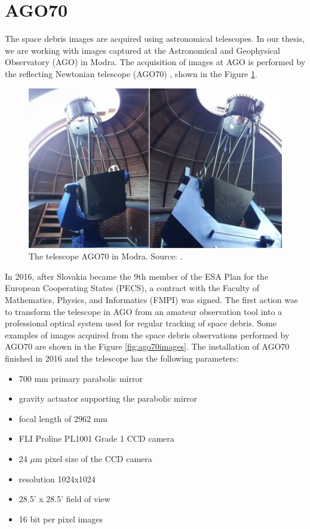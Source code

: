 \section{AGO70}
The space debris images are acquired using astronomical telescopes. 
In our thesis, we are working with images captured at the Astronomical and Geophysical Observatory (AGO) in Modra. The acquisition of images at AGO is performed by the reflecting Newtonian telescope (AGO70) \cite{ago702018}, shown in the Figure \ref{img:ago70}. 

\begin{figure}[h]
    \centering
    \includegraphics[width=.5\textwidth]{images/ago70.png}
    \caption{The telescope AGO70 in Modra. Source: \cite{ago702018}.}
    \label{img:ago70}
\end{figure}

In 2016, after Slovakia became the 9th member of the ESA Plan for the European Cooperating States (PECS), a contract with the Faculty of Mathematics, Physics, and Informatics (FMPI) was signed. The first action was to transform the telescope in AGO from an amateur observation tool into a professional optical system used for regular tracking of space debris. Some examples of images acquired from the space debris observations performed by AGO70 are shown in the Figure \ref{fig:ago70images}. The installation of AGO70 finished in 2016 and the telescope has the following parameters: 

\begin{itemize}
    \item 700 mm primary parabolic mirror
    \item gravity actuator supporting the parabolic mirror
    \item focal length of 2962 mm
    \item FLI Proline PL1001 Grade 1 CCD camera
    \item 24 $\mu$m pixel size of the CCD camera
    \item resolution 1024x1024
    \item 28.5' x 28.5' field of view
    \item 16 bit per pixel images
\end{itemize}


